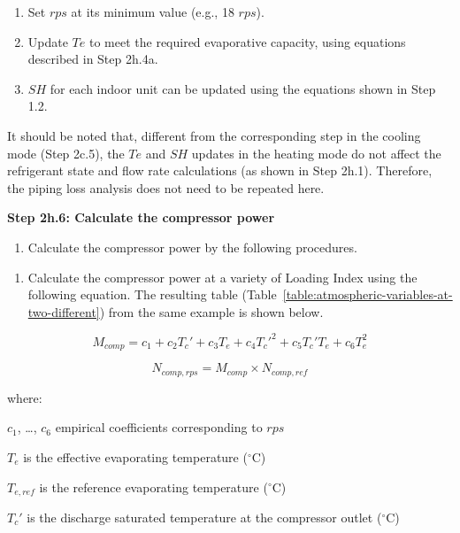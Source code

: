 \begin{enumerate}
\def\labelenumi{\alph{enumi}.}
\item
  Set \(rps\) at its minimum value (e.g., 18 \(rps\)).
\item
  Update \(Te\) to meet the required evaporative capacity, using equations described in Step 2h.4a.
\item
  \(SH\) for each indoor unit can be updated using the equations shown in Step 1.2.
\end{enumerate}

It should be noted that, different from the corresponding step in the cooling mode (Step 2c.5), the \(Te\) and \(SH\) updates in the heating mode do not affect the refrigerant state and flow rate calculations (as shown in Step 2h.1). Therefore, the piping loss analysis does not need to be repeated here.

\textbf{Step 2h.6: Calculate the compressor power}

\begin{enumerate}
\def\labelenumi{(\arabic{enumi})}
\tightlist
\item
  Calculate the compressor power by the following procedures. 
\end{enumerate}

\begin{enumerate}
\def\labelenumi{\alph{enumi}.}
\tightlist
\item
  Calculate the compressor power at a variety of Loading Index using the following equation. The resulting table (Table~\ref{table:atmospheric-variables-at-two-different}) from the same example is shown below.
\end{enumerate}

\begin{equation}
  M_{comp} = c_1+c_2{T_c}'+c_3T_e+c_4{T_c}'^2+c_5{T_c}'T_e+c_6T_e^2
\end{equation}

\begin{equation}
  N_{comp,rps} = M_{comp} \times N_{comp,ref}
\end{equation}

where:

\(c_1\), \ldots{}, \(c_6\) empirical coefficients corresponding to \(rps\)

\(T_e\) is the effective evaporating temperature (\(^{\circ}\)C)

\(T_{e,ref}\) is the reference evaporating temperature (\(^{\circ}\)C)

\({T_c}'\) is the discharge saturated temperature at the compressor outlet (\(^{\circ}\)C)

